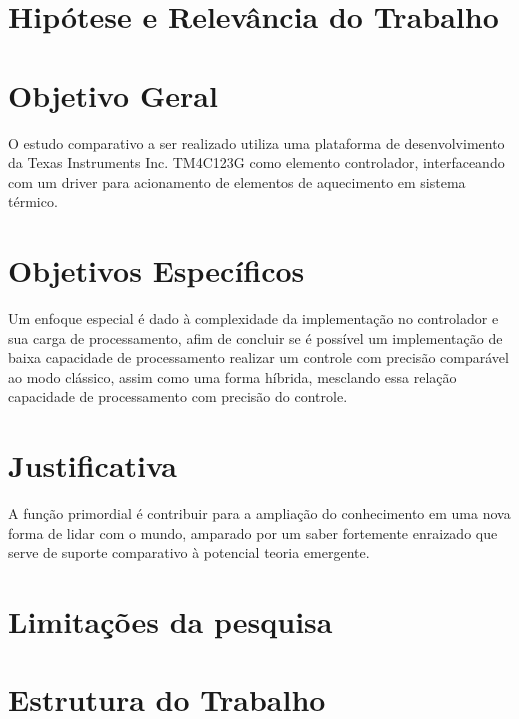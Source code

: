 \documentclass[12pt,a4paper]{report}
\begin{document}
\section{Hipótese e Relevância do Trabalho}

\section{Objetivo Geral}
O estudo comparativo a ser realizado utiliza uma plataforma de desenvolvimento da Texas Instruments Inc. TM4C123G como elemento controlador, interfaceando com um driver para acionamento de elementos de aquecimento em sistema térmico.

\section{Objetivos Específicos}
Um enfoque especial é dado à complexidade da implementação no controlador e sua carga de processamento, afim de concluir se é possível um implementação de baixa capacidade de processamento realizar um controle com precisão comparável ao modo clássico, assim como uma forma híbrida, mesclando essa relação capacidade de processamento com precisão do controle. 


\section{Justificativa}
A função primordial é contribuir para a ampliação do conhecimento em uma nova forma de lidar com o mundo, amparado por um saber fortemente enraizado que serve de suporte comparativo à potencial teoria emergente.

\section{Limitações da pesquisa}

\section{Estrutura do Trabalho}


\end{document}
